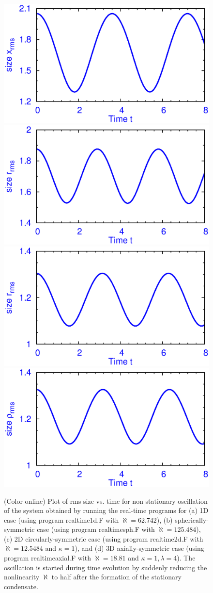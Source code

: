 \documentclass[onecolumn]{elsart3p}
\begin{document}
\begin{figure}[tbp] \begin{center}
{\includegraphics[width=.45\linewidth]{fig5a.ps}}
{\includegraphics[width=.45\linewidth]{fig5b.ps}}
{\includegraphics[width=.45\linewidth]{fig5c.ps}}
{\includegraphics[width=.45\linewidth]{fig5d.ps}}
\end{center}
\caption{(Color online) Plot of rms size vs. time for non-stationary
oscillation of the system obtained by running the real-time programs for
(a) 1D  case (using program realtime1d.F with
$\aleph %
= 62.742$), (b)  spherically-symmetric case (using
program realtimesph.F with
$\aleph  %
= 125.484$), (c) 2D circularly-symmetric case (using
program realtime2d.F
with $\aleph %
= 12.5484$ and $\kappa=1$),  and
(d) 3D axially-symmetric case (using program realtimeaxial.F  with
 $\aleph %
= 18.81$ and $\kappa=1, \lambda=4$).
 The oscillation is started during time evolution
by suddenly reducing the
nonlinearity $\aleph$  %
to half after the formation of the 
stationary
condensate.}
\label{fig5}
\end{figure}
\end{document}
